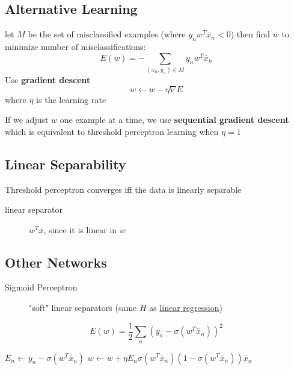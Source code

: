 \documentclass[]{article}
\theoremstyle{definition}
\begin{document}
    \subsection{Alternative Learning}
    \label{sub:alternative_learning}
    let $M$ be the set of misclassified examples (where $y_n w^T \bar x_n < 0$) then find $w$ to minimize number of misclassifications:
    \begin{equation*}
        E(w) = - \sum_{(x_n, y_n) \in M} y_n w^T \bar x_n
    \end{equation*}
    Use \textbf{gradient descent} 
    \begin{equation*}
        w \leftarrow w - \eta \nabla E 
    \end{equation*}
    where $\eta$ is the learning rate

    \vspace{5mm}

    If we adjust $w$ one example at a time, we use \textbf{sequential gradient descent} which is equivalent to threshold perceptron learning when $\eta = 1$

    \subsection{Linear Separability}
    \label{sub:linear_separability}
    Threshold perceptron converges iff the data is linearly separable
    
    \begin{description}
        \item[linear separator] $w^T \bar x$, since it is linear in $w$
    \end{description} 

    \subsection{Other Networks}
    \label{sub:other_networks}
    \begin{description}
        \item[Sigmoid Perceptron] "soft" linear separators (same $H$ as \hyperref[sec:logistic_regression]{linear regression})
    \end{description}
    \begin{equation*}
        E(w) = \frac{1}{2} \sum_n (y_n - \sigma (w^T \bar x_n))^2
    \end{equation*}
    \begin{algorithmic}
        \State $E_n \leftarrow y_n - \sigma (w^T \bar x_n)$
        \State $w \leftarrow w + \eta E_n \sigma (w^T \bar x_n)(1 - \sigma (w^T \bar x_n)) \bar x_n$
        \EndFor
    \end{algorithmic} 
\end{document}
